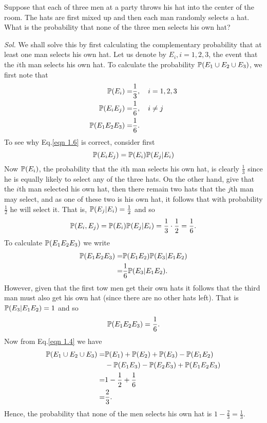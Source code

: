 \begin{example}
    Suppose that each of three men at a party throws his hat into the center of the room. The hats are first mixed up and then each man randomly selects a hat. What is the probability that none of the three men selects his own hat?

    \textit{ Sol. } We shall solve this by first calculating the complementary probability that at least one man selects his own hat. Let us denote by $E_i, i = 1, 2, 3$, the event that the $i$th man selects his own hat. To calculate the probability $\mathbb{P} (E_1 \cup E_2 \cup E_3)$, we first note that
    \begin{align}
        \mathbb{P} (E_i) = & \frac{1}{3},  \quad i = 1,2,3 \notag \\ 
        \mathbb{P} (E_i E_j) = & \frac{1}{6}, \quad i \neq j \label{eqn 1.6} \\ 
        \mathbb{P} (E_1 E_2 E_3) = & \frac{1}{6}. \notag
    \end{align}
    To see why Eq.\eqref{eqn 1.6} is correct, consider first 
    \begin{equation*}
        \mathbb{P}(E_i E_j) = \mathbb{P} (E_i) \mathbb{P} (E_j | E_i)
    \end{equation*}
    Now $\mathbb{P} (E_i)$, the probability that the $i$th man selects his own hat, is clearly $\frac{1}{3}$ since he is equally likely to select any of the three hats. On the other hand, give that the $i$th man selected his own hat, then there remain two hats that the $j$th man may select, and as one of these two is his own hat, it follows that with probability $\frac{1}{2}$ he will select it. That is, $\mathbb{P} (E_j|E_i) = \frac{1}{2}$ and so 
    \begin{equation*}
        \mathbb{P} (E_i, E_j) = \mathbb{P} (E_i) \mathbb{P} (E_j | E_i) = \frac{1}{3} \cdot \frac{1}{2} = \frac{1}{6}. 
    \end{equation*}
    To calculate $\mathbb{P}(E_1 E_2 E_3)$ we write 
    \begin{align*}
        \mathbb{P} (E_1 E_2 E_3) = & \mathbb{P} (E_1  E_2) \mathbb{P} (E_3 | E_1 E_2) \\ 
        = & \frac{1}{6} \mathbb{P} (E_3 | E_1 E_2).
    \end{align*}
    However, given that the first tow men get their own hats it follows that the third man must also get his own hat (since there  are no other hats left). That is $\mathbb{P} (E_3 | E_1 E_2) = 1$ and so 
    \begin{equation*}
        \mathbb{P} (E_1 E_2 E_3) = \frac{1}{6}.
    \end{equation*}
    Now from Eq.\eqref{eqn 1.4} we have 
    \begin{align*}
        \mathbb{P} (E_1 \cup E_2 \cup E_3) = & \mathbb{P} (E_1) + \mathbb{P} (E_2) + \mathbb{P} (E_3) - \mathbb{P} (E_1 E_2) \\ 
        & - \mathbb{P} (E_1 E_3) - \mathbb{P} (E_2 E_3) + \mathbb{P} (E_1 E_2 E_3) \\ 
        = & 1 - \frac{1}{2} + \frac{1}{6} \\ 
        = & \frac{2}{3}.
    \end{align*}
    Hence, the probability that none of the men selects his own hat is $1 - \frac{2}{3} = \frac{1}{3}$.
\end{example}
